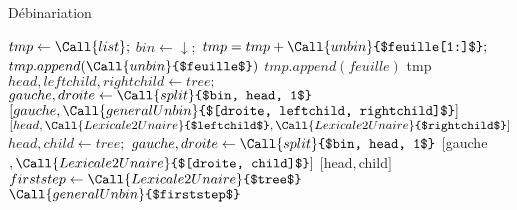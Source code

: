 \documentclass{article}
\begin{document}
\begin{algorithm}
\caption{Débinariation}
\label{unbin}
	\begin{algorithmic}
			\State $tmp \gets \Call{list} ;$
			\State $bin \gets \downarrow;$
						\State $tmp = tmp + \Call{unbin}{$feuille[1:]$};$
					\Else
						\State $tmp.append(\Call{unbin}{$feuille$})$
					\EndIf
				\Else
					\State $tmp.append(feuille)$
				\EndIf
			\EndFor
			\State \Return tmp
		\EndFunction
				\State $head, leftchild, rightchild \gets tree;$
					\State $gauche, droite \gets \Call{split}{$bin, head, 1$}$
					\State \Return $[gauche, \Call{generalUnbin}{$[droite, leftchild, rightchild]$}]$
				\Else
					\State \Return $[head, \Call{Lexicale2Unaire}{$leftchild$}, \Call{Lexicale2Unaire}{$rightchild$}]$
				\EndIf
				\State $head, child \gets tree;$
					\State $gauche, droite \gets \Call{split}{$bin, head, 1$}$
					\State \Return $[$gauche$, \Call{Lexicale2Unaire}{$[droite, child]$}]$
				\Else
					\State \Return $[$head$, $child$]$
				\EndIf
			\EndIf
		\EndFunction
			\State $firststep \gets \Call{Lexicale2Unaire}{$tree$}$
			\State \Return $\Call{generalUnbin}{$firststep$}$
		\EndFunction
	\end{algorithmic}
\end{algorithm}
\end{document}
